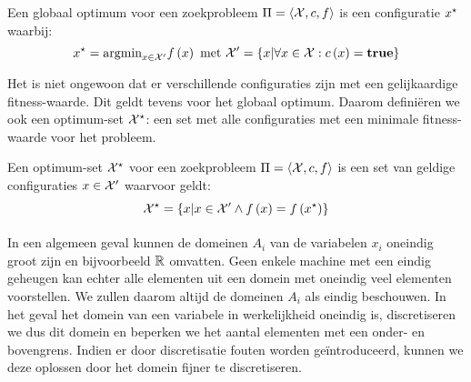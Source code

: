 \begin{definition}
Een globaal optimum voor een zoekprobleem $\Pi=\left\langle \mathcal{X},c,f\right\rangle$ is een configuratie $x^{\star}$ waarbij:
\begin{equation}
x^{\star}=\displaystyle\mbox{argmin}_{x\in\mathcal{X}'}f\left(x\right)\mbox{ met }\mathcal{X}'=\left\{ x|\forall x\in\mathcal{X}:c\left(x\right)=\mbox{\textbf{true}}\right\}
\end{equation}
\end{definition}

Het is niet ongewoon dat er verschillende configuraties zijn met een gelijkaardige fitness-waarde. Dit geldt tevens voor het globaal optimum. Daarom defini\"eren we ook een optimum-set $\mathcal{X}^{\star}$: een set met alle configuraties met een minimale fitness-waarde voor het probleem.

\begin{definition}
Een optimum-set $\mathcal{X}^{\star}$ voor een zoekprobleem $\Pi=\left\langle \mathcal{X},c,f\right\rangle$ is een set van geldige configuraties $x\in\mathcal{X}'$ waarvoor geldt:
\begin{equation}
\mathcal{X}^{\star}=\left\{ x|x\in\mathcal{X}'\wedge f\left(x\right)=f\left(x^{\star}\right)\right\}
\end{equation}
\end{definition}

\paragraph{}
In een algemeen geval kunnen de domeinen $A_i$ van de variabelen $x_i$ oneindig groot zijn en bijvoorbeeld $\mathbb{R}$ omvatten. Geen enkele machine met een eindig geheugen kan echter alle elementen uit een domein met oneindig veel elementen voorstellen. We zullen daarom altijd de domeinen $A_i$ als eindig beschouwen. In het geval het domein van een variabele in werkelijkheid oneindig is, discretiseren we dus dit domein en beperken we het aantal elementen met een onder- en bovengrens. Indien er door discretisatie fouten worden ge\"introduceerd, kunnen we deze oplossen door het domein fijner te discretiseren.
